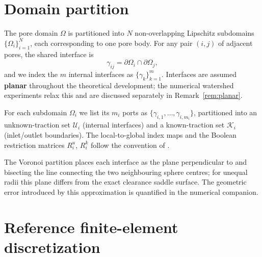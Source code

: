 \documentclass[11pt,a4paper]{article}
\newcommand{\dom}{\Omega}
\newcommand{\pore}[1]{\Omega_{#1}}
\newcommand{\iface}{\gamma}
\begin{document}
\section{Domain partition}

The pore domain $\dom$ is partitioned into $N$ non-overlapping Lipschitz
subdomains $\{\pore{i}\}_{i=1}^N$, each corresponding to one pore body.
For any pair $(i,j)$ of adjacent pores, the shared interface is
\[
  \iface_{ij} = \partial\pore{i} \cap \partial\pore{j},
\]
and we index the $m$ internal interfaces as $\{\iface_k\}_{k=1}^m$.
Interfaces are assumed \textbf{planar} throughout the theoretical
development; the numerical watershed experiments relax this and are
discussed separately in Remark~\ref{rem:planar}.

For each subdomain $\pore{i}$ we list its $m_i$ ports as
$\{\iface_{i,1},\dots,\iface_{i,m_i}\}$, partitioned into an
unknown-traction set $\mathcal{U}_i$ (internal interfaces) and a
known-traction set $\mathcal{K}_i$ (inlet/outlet boundaries).  The
local-to-global index maps and the Boolean restriction matrices
$R_i^u$, $R_i^k$ follow the convention of \cite[Section~2.4]{sun2025ddpnm}.

The Voronoi partition places each interface as the plane perpendicular to
and bisecting the line connecting the two neighbouring sphere centres;
for unequal radii this plane differs from the exact clearance saddle
surface.  The geometric error introduced by this approximation is
quantified in the numerical companion.

\section{Reference finite-element discretization}
\end{document}
